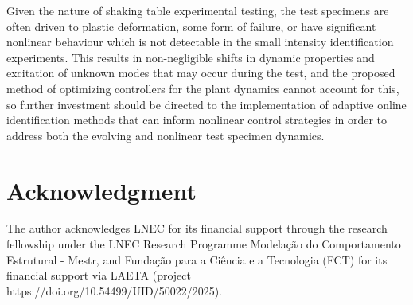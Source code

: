 \documentclass[ 10pt, twocolumn]{article} %
\begin{document}
Given the nature of shaking table experimental testing, the test specimens are often driven to plastic deformation, some form of failure, or have significant nonlinear behaviour which is not detectable in the small intensity identification experiments. This results in non-negligible shifts in dynamic properties and excitation of unknown modes that may occur during the test, and the proposed method of optimizing controllers for the plant dynamics cannot account for this, so further investment should be directed to the implementation of adaptive online identification methods that can inform nonlinear control strategies in order to address both the evolving and nonlinear test specimen dynamics.

\section*{Acknowledgment}
The author acknowledges LNEC for its financial support through the research fellowship under the LNEC Research Programme Modelação do Comportamento Estrutural - Mestr, and Fundação para a Ciência e a Tecnologia (FCT) for its financial support via LAETA (project https://doi.org/10.54499/UID/50022/2025).

\setlength{\bibsep}{1pt} %


\end{document}

